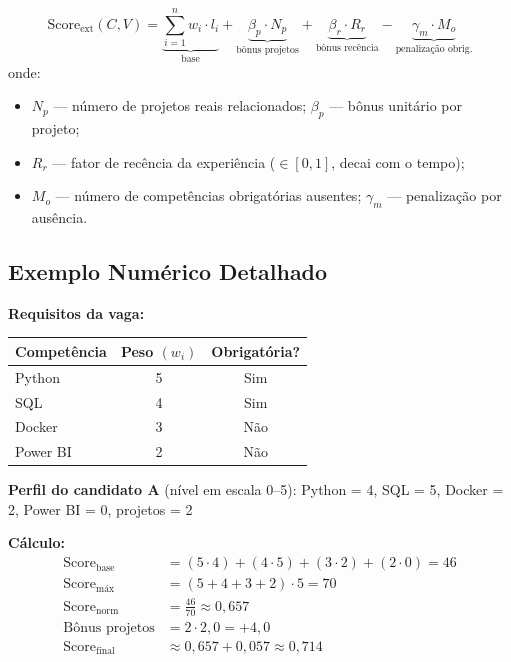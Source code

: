 \documentclass[12pt,a4paper]{article}
\begin{document}
\begin{formulabox}
\begin{equation}
  \text{Score}_{\text{ext}}(C, V) = \underbrace{\sum_{i=1}^{n} w_i \cdot l_i}_{\text{base}}
  + \underbrace{\beta_p \cdot N_p}_{\text{bônus projetos}}
  + \underbrace{\beta_r \cdot R_r}_{\text{bônus recência}}
  - \underbrace{\gamma_m \cdot M_o}_{\text{penalização obrig.}}
  \label{eq:wss_ext}
\end{equation}
onde:
\begin{itemize}
  \item $N_p$ — número de projetos reais relacionados; $\beta_p$ — bônus unitário por projeto;
  \item $R_r$ — fator de recência da experiência ($\in [0,1]$, decai com o tempo);
  \item $M_o$ — número de competências obrigatórias ausentes; $\gamma_m$ — penalização por ausência.
\end{itemize}
\end{formulabox}

\subsection{Exemplo Numérico Detalhado}

\begin{examplebox}
\textbf{Requisitos da vaga:}
\begin{center}
\begin{tabular}{lcc}
  \toprule
  Competência & Peso $(w_i)$ & Obrigatória? \\
  \midrule
  Python     & 5 & Sim \\
  SQL        & 4 & Sim \\
  Docker     & 3 & Não \\
  Power BI   & 2 & Não \\
  \bottomrule
\end{tabular}
\end{center}
\textbf{Perfil do candidato A} (nível em escala 0–5):
Python = 4, SQL = 5, Docker = 2, Power BI = 0, projetos = 2

\textbf{Cálculo:}
\begin{align*}
  \text{Score}_{\text{base}} &= (5 \cdot 4) + (4 \cdot 5) + (3 \cdot 2) + (2 \cdot 0) = 46 \\
  \text{Score}_{\text{máx}}  &= (5 + 4 + 3 + 2) \cdot 5 = 70 \\
  \text{Score}_{\text{norm}} &= \frac{46}{70} \approx 0{,}657 \\
  \text{Bônus projetos}      &= 2 \cdot 2{,}0 = +4{,}0 \\
  \text{Score}_{\text{final}} &\approx 0{,}657 + 0{,}057 \approx 0{,}714
\end{align*}
\end{examplebox}
\end{document}
